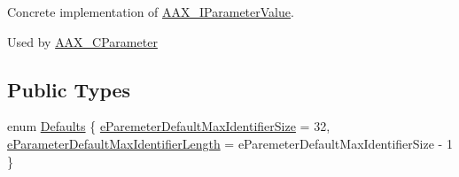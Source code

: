 Concrete implementation of \mbox{\hyperlink{a01853}{A\+A\+X\+\_\+\+I\+Parameter\+Value}}. 

Used by \mbox{\hyperlink{a01537}{A\+A\+X\+\_\+\+C\+Parameter}} \subsection*{Public Types}
\begin{DoxyCompactItemize}
\item 
enum \mbox{\hyperlink{a01533_a559b1aa8a083ff7ce3251103fc74bf39}{Defaults}} \{ \mbox{\hyperlink{a01533_a559b1aa8a083ff7ce3251103fc74bf39afcb4963e49ff01a53c02c071fda5a0b4}{e\+Paremeter\+Default\+Max\+Identifier\+Size}} = 32, 
\mbox{\hyperlink{a01533_a559b1aa8a083ff7ce3251103fc74bf39a471b7bbe5310d88a7fe073bab18d7d15}{e\+Parameter\+Default\+Max\+Identifier\+Length}} = e\+Paremeter\+Default\+Max\+Identifier\+Size -\/ 1
 \}
\end{DoxyCompactItemize}
